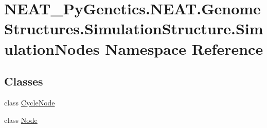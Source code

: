 \hypertarget{namespaceNEAT__PyGenetics_1_1NEAT_1_1GenomeStructures_1_1SimulationStructure_1_1SimulationNodes}{}\section{N\+E\+A\+T\+\_\+\+Py\+Genetics.\+N\+E\+A\+T.\+Genome\+Structures.\+Simulation\+Structure.\+Simulation\+Nodes Namespace Reference}
\label{namespaceNEAT__PyGenetics_1_1NEAT_1_1GenomeStructures_1_1SimulationStructure_1_1SimulationNodes}
\subsection*{Classes}
\begin{DoxyCompactItemize}
\item 
class \hyperlink{classNEAT__PyGenetics_1_1NEAT_1_1GenomeStructures_1_1SimulationStructure_1_1SimulationNodes_1_1CycleNode}{Cycle\+Node}
\item 
class \hyperlink{classNEAT__PyGenetics_1_1NEAT_1_1GenomeStructures_1_1SimulationStructure_1_1SimulationNodes_1_1Node}{Node}
\end{DoxyCompactItemize}
